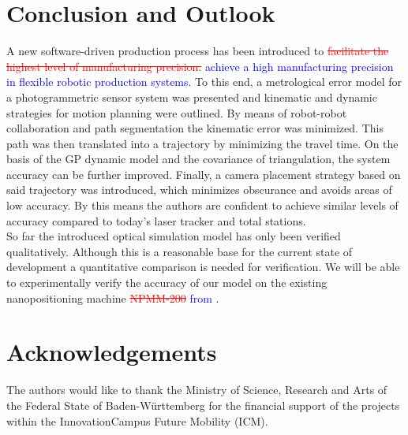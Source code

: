 \documentclass[5p,times,procedia]{elsarticle}
\newcommand{\rem}[1]{\textcolor{red}{\sout{#1}}}
\newcommand{\prop}[1]{\textcolor{blue}{#1}}
\begin{document}
\section{Conclusion and Outlook}
A new software-driven production process has been introduced to \rem{facilitate the highest level of manufacturing precision.}
\prop{achieve a high manufacturing precision in flexible robotic production systems.}
To this end, a metrological error model for a photogrammetric sensor system was presented and kinematic and dynamic strategies for motion planning were outlined. By means of robot-robot collaboration and path segmentation the kinematic error was minimized. This path was then translated into a trajectory by minimizing the travel time. On the basis of the GP dynamic model and the covariance of triangulation, the system accuracy can be further improved. Finally, a camera placement strategy based on said trajectory was introduced, which minimizes obscurance and avoids areas of low accuracy. By this means the authors are confident to achieve similar levels of accuracy compared to today's laser tracker and total stations.\\
So far the introduced optical simulation model has only been verified qualitatively. Although this is a reasonable base for the current state of development a quantitative comparison is needed for verification. 
We will be able to experimentally verify the accuracy of our model on the existing nanopositioning machine \rem{NPMM-200} \prop{from} \cite{Jaeger2016}.
%
\section*{Acknowledgements}
The authors would like to thank the Ministry of Science, Research and Arts of the Federal State of Baden-Württemberg for the financial support of the projects within the InnovationCampus Future Mobility (ICM).
%


%
\clearpage\onecolumn
%
\normalMode
%
\end{document}
